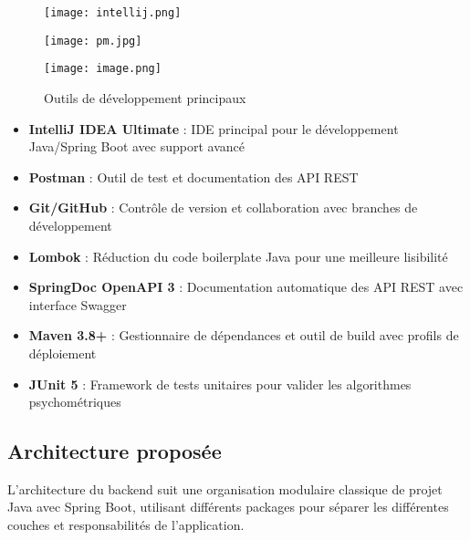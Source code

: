 \documentclass[12pt,a4paper]{report}
\begin{document}
\begin{figure}[H]
\centering
\begin{minipage}{0.2\textwidth}
\centering
\texttt{[image: intellij.png]}
\end{minipage}
\hfill
\begin{minipage}{0.2\textwidth}
\centering
\texttt{[image: pm.jpg]}
\end{minipage}
\hfill
\begin{minipage}{0.2\textwidth}
\centering
\texttt{[image: image.png]}
\end{minipage}
\hfill

\caption{Outils de développement principaux}
\label{fig:dev-tools}
\end{figure}

\begin{itemize}
    \item \textbf{IntelliJ IDEA Ultimate} : IDE principal pour le développement Java/Spring Boot avec support avancé
    \item \textbf{Postman} : Outil de test et documentation des API REST
    \item \textbf{Git/GitHub} : Contrôle de version et collaboration avec branches de développement
    \item \textbf{Lombok} : Réduction du code boilerplate Java pour une meilleure lisibilité
    \item \textbf{SpringDoc OpenAPI 3} : Documentation automatique des API REST avec interface Swagger
    \item \textbf{Maven 3.8+} : Gestionnaire de dépendances et outil de build avec profils de déploiement
    \item \textbf{JUnit 5} : Framework de tests unitaires pour valider les algorithmes psychométriques
\end{itemize}

\subsection{Architecture proposée}

L'architecture du backend suit une organisation modulaire classique de projet Java avec Spring Boot, utilisant différents packages pour séparer les différentes couches et responsabilités de l'application.
\end{document}
